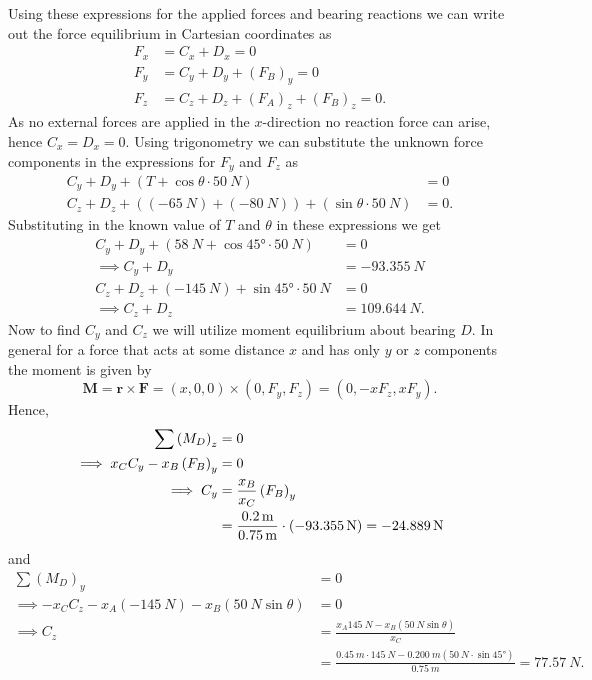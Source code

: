 \documentclass[a4paper]{article}
\theoremstyle{definition}
\begin{document}
Using these expressions for the applied forces and bearing reactions we can write out the force equilibrium in Cartesian coordinates as
\begin{align*}
  F_x &= C_x + D_x = 0 \\
  F_y &= C_y + D_y + \left( F_B \right)_y = 0\\
  F_z &= C_z + D_z + \left( F_A \right)_z + \left( F_B \right)_z = 0
.\end{align*}
As no external forces are applied in the $x$-direction no reaction force can arise, hence $C_x = D_x = 0$. Using trigonometry we can substitute the unknown force components in the expressions for $F_y$ and $F_z$ as
\begin{align*}
  C_y + D_y + \left( T + \cos \theta  \cdot \qty{50}{N} \right) &= 0 \\
  C_z + D_z + \left( (\qty{-65}{N} ) + \left( \qty{-80}{N} \right) \right) + \left( \sin \theta \cdot \qty{50}{N} \right) &= 0
.\end{align*}
Substituting in the known value of $T$ and $\theta$ in these expressions we get
\begin{align*}
  C_y + D_y + \left( \qty{58}{N} + \cos \ang{45} \cdot \qty{50}{N} \right) &= 0 \\
 \implies C_y + D_y &= \qty{-93,355}{N} \\
  C_z + D_z + \left( \qty{-145}{N}  \right) + \sin \ang{45} \cdot \qty{50}{N} &= 0 \\
\implies  C_z + D_z &= \qty{109,644}{N} 
.\end{align*}
Now to find $C_y$ and $C_z$ we will utilize moment equilibrium about bearing $D$. In general for a force that acts at some distance $x$ and has only $y$ or $z$ components the moment is given by
\[ 
\textbf{M} = \textbf{r} \times \textbf{F} = \left( x, 0, 0 \right) \times \left( 0, F_y, F_z \right) = \left( 0, -x F_z, x F_y \right)
.\]
Hence,
\begin{align*}
  \sum \left( M_D \right)_z &= 0 \\
  \implies x_C C_y - x_B \left( F_B \right)_y &= 0 \\
  \implies C_y &= \frac{x_B}{x_C} \left( F_B \right)_y \\
             &= \frac{\qty{0,2}{m} }{\qty{0,75}{m}} \cdot (\qty{- 93,355}{N}) = \qty{-24,889}{N} 
\end{align*}
and
\begin{align*}
  \sum \left( M_D \right)_y &= 0 \\
  \implies - x_C C_z - x_A \left( \qty{-145}{N}  \right) - x_B \left( \qty{50}{N}  \sin \theta \right) &= 0 \\
  \implies C_z &= \frac{ x_A \qty{145}{N} - x_B \left( \qty{50}{N}  \sin \theta \right) }{x_C} \\
        &= \frac{\qty{0,45}{m} \cdot \qty{145}{N} - \qty{0,200}{m} \left( \qty{50}{N} \cdot \sin \ang{45}  \right)}{\qty{0,75}{m} } = \qty{77,57}{N} 
.\end{align*}
\end{document}
